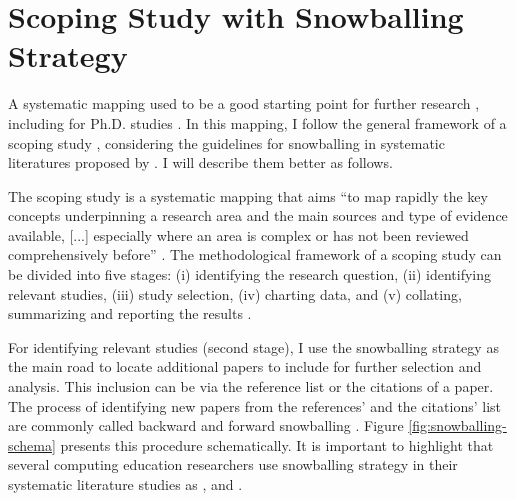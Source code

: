 \section{Scoping Study with Snowballing Strategy}
\label{rel-work:scoping-snowball}

A systematic mapping used to be a good starting point for further research \cite{kitchenham:2011}, including for \gls{Ph.D.} studies \cite{kitchenham:2010}. In this mapping, I follow the general framework of a scoping study \cite{arksey:2005}, considering the guidelines for snowballing in systematic literatures proposed by . I will describe them better as follows.

The scoping study is a systematic mapping that aims “to map rapidly the key concepts underpinning a research area and the main sources and type of evidence available, [...] especially where an area is complex or has not been reviewed comprehensively before” \cite[p.~21]{arksey:2005}. The methodological framework of a scoping study can be divided into five stages: (i) identifying the research question, (ii) identifying relevant studies, (iii) study selection, (iv) charting data, and (v) collating, summarizing and reporting the results \cite[p.~22]{arksey:2005}.

For identifying relevant studies (second stage), I use the snowballing strategy as the main road to locate additional papers to include for further selection and analysis. This inclusion can be via the reference list or the citations of a paper. The process of identifying new papers from the references’ and the citations’ list are commonly called backward and forward snowballing \cite[p.~1]{wohlin:2014}. Figure \ref{fig:snowballing-schema} presents this procedure schematically. It is important to highlight that several computing education researchers use snowballing strategy in their systematic literature studies as ,  and .

